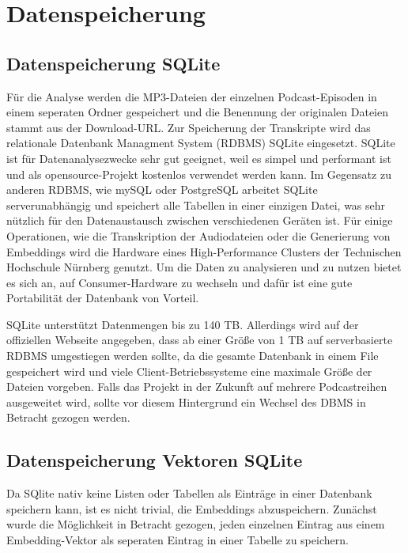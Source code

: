 \section{Datenspeicherung}

\subsection{Datenspeicherung SQLite}

Für die Analyse werden die MP3-Dateien der einzelnen Podcast-Episoden in einem seperaten Ordner gespeichert und die Benennung der originalen Dateien stammt aus der Download-URL.
Zur Speicherung der Transkripte wird das relationale Datenbank Managment System (RDBMS) SQLite  eingesetzt. SQLite ist für Datenanalysezwecke sehr gut geeignet, weil es simpel und performant ist und als opensource-Projekt kostenlos verwendet werden kann.
Im Gegensatz zu anderen RDBMS, wie mySQL oder PostgreSQL arbeitet SQLite serverunabhängig und speichert alle Tabellen in einer einzigen Datei, was sehr nützlich für den Datenaustausch zwischen verschiedenen Geräten ist.
Für einige Operationen, wie die Transkription der Audiodateien oder die Generierung von Embeddings wird die Hardware eines High-Performance Clusters der Technischen Hochschule Nürnberg genutzt. 
Um die Daten zu analysieren und zu nutzen bietet es sich an, auf Consumer-Hardware zu wechseln und dafür ist eine gute Portabilität der Datenbank von Vorteil.

SQLite unterstützt Datenmengen bis zu 140 TB. 
Allerdings wird auf der offiziellen Webseite angegeben, dass ab einer Größe von 1 TB auf serverbasierte RDBMS umgestiegen werden sollte, da die gesamte Datenbank in einem File gespeichert wird und viele Client-Betriebssysteme eine maximale Größe der Dateien vorgeben. 
Falls das Projekt in der Zukunft auf mehrere Podcastreihen ausgeweitet wird, sollte vor diesem Hintergrund ein Wechsel des DBMS in Betracht gezogen werden.

\subsection{Datenspeicherung Vektoren SQLite}

Da SQlite nativ keine Listen oder Tabellen als Einträge in einer Datenbank speichern kann, ist es nicht trivial, die Embeddings abzuspeichern.
Zunächst wurde die Möglichkeit in Betracht gezogen, jeden einzelnen Eintrag aus einem Embedding-Vektor als seperaten Eintrag in einer Tabelle zu speichern. 

